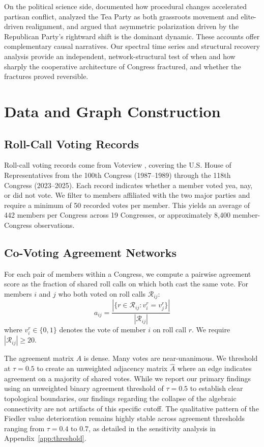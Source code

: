 \documentclass[12pt, a4paper]{article}
\begin{document}
On the political science side, \citet{theriault2008} documented how procedural changes accelerated partisan conflict, \citet{skocpol2012} analyzed the Tea Party as both grassroots movement and elite-driven realignment, and \citet{mann2012} argued that asymmetric polarization driven by the Republican Party's rightward shift is the dominant dynamic. These accounts offer complementary causal narratives. Our spectral time series and structural recovery analysis provide an independent, network-structural test of when and how sharply the cooperative architecture of Congress fractured, and whether the fractures proved reversible.

\section{Data and Graph Construction}\label{sec:data}

\subsection{Roll-Call Voting Records}

Roll-call voting records come from Voteview \citep{lewis2023}, covering the U.S. House of Representatives from the 100th Congress (1987--1989) through the 118th Congress (2023--2025). Each record indicates whether a member voted yea, nay, or did not vote. We filter to members affiliated with the two major parties and require a minimum of 50 recorded votes per member. This yields an average of 442 members per Congress across 19 Congresses, or approximately 8,400 member-Congress observations.

\subsection{Co-Voting Agreement Networks}

For each pair of members within a Congress, we compute a pairwise agreement score as the fraction of shared roll calls on which both cast the same vote. For members $i$ and $j$ who both voted on roll calls $\mathcal{R}_{ij}$:
\begin{equation}
    a_{ij} = \frac{|\{r \in \mathcal{R}_{ij} : v_i^r = v_j^r\}|}{|\mathcal{R}_{ij}|}
\end{equation}
where $v_i^r \in \{0, 1\}$ denotes the vote of member $i$ on roll call $r$. We require $|\mathcal{R}_{ij}| \geq 20$.

The agreement matrix $A$ is dense. Many votes are near-unanimous. We threshold at $\tau = 0.5$ to create an unweighted adjacency matrix $\hat{A}$ where an edge indicates agreement on a majority of shared votes. While we report our primary findings using an unweighted binary agreement threshold of $\tau = 0.5$ to establish clear topological boundaries, our findings regarding the collapse of the algebraic connectivity are not artifacts of this specific cutoff. The qualitative pattern of the Fiedler value deterioration remains highly stable across agreement thresholds ranging from $\tau = 0.4$ to $0.7$, as detailed in the sensitivity analysis in Appendix~\ref{app:threshold}.
\end{document}
